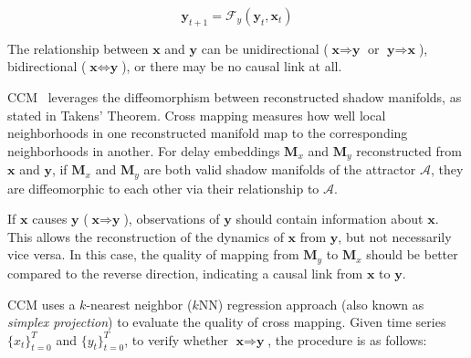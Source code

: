 \begin{equation}
\label{eq:def_cause}
    \textbf{y}_{t+1}=\mathcal{F}_y \left(\textbf{y}_{t}, \textbf{x}_{t} \right)
\end{equation}

The relationship between $\textbf{x}$ and $\textbf{y}$ can be unidirectional ($\textbf{x} \Rightarrow \textbf{y}$ or $\textbf{y} \Rightarrow \textbf{x}$), bidirectional ($\textbf{x} \Leftrightarrow \textbf{y}$), or there may be no causal link at all.


CCM~\citep{sugihara2012detecting} leverages the diffeomorphism between reconstructed shadow manifolds, as stated in Takens' Theorem. Cross mapping measures how well local neighborhoods in one reconstructed manifold map to the corresponding neighborhoods in another. For delay embeddings $\textbf{M}_x$ and $\textbf{M}_y$ reconstructed from $\textbf{x}$ and $\textbf{y}$, if $\textbf{M}_x$ and $\textbf{M}_y$ are both valid shadow manifolds of the attractor $\mathcal{A}$, they are diffeomorphic to each other via their relationship to $\mathcal{A}$.

If $\textbf{x}$ causes $\textbf{y}$ ($\textbf{x} \Rightarrow \textbf{y}$), observations of $\textbf{y}$ should contain information about $\textbf{x}$. This allows the reconstruction of the dynamics of $\textbf{x}$ from $\textbf{y}$, but not necessarily vice versa. In this case, the quality of mapping from $\textbf{M}_y$ to $\textbf{M}_x$ should be better compared to the reverse direction, indicating a causal link from $\textbf{x}$ to $\textbf{y}$.

CCM uses a $k$-nearest neighbor ($k$NN) regression approach (also known as \textit{simplex projection}) to evaluate the quality of cross mapping. Given time series $\{x_t\}_{t=0}^{T}$ and $\{y_t\}_{t=0}^{T}$, to verify whether $\textbf{x} \Rightarrow \textbf{y}$, the procedure is as follows:

